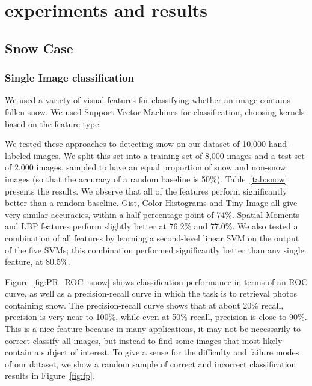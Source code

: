 \section{experiments and results}




\subsection{Snow Case}

\subsubsection{Single Image classification}

We used a variety of  visual features  for classifying
whether an image contains fallen snow. We used Support Vector
Machines for classification, choosing kernels based on the feature
type. 

We tested these approaches to detecting snow on our dataset of
10,000 hand-labeled images. We split this set into a training set of
8,000 images and a test set of 2,000 images, sampled to have an
 equal proportion of snow and non-snow images (so
that the accuracy of a random baseline is 50\%).
Table~\ref{tab:snow} presents the results. We observe that all of the
features perform significantly better than a random baseline. 
Gist, Color Histograms and Tiny Image all give very similar accuracies, within a half
percentage point of 74\%. Spatial Moments and
LBP  features perform
slightly better at 76.2\% and 77.0\%. We also tested a combination of all 
features by learning a second-level linear SVM on the output of the
five SVMs; this combination performed significantly better than any single feature,
at 80.5\%.


Figure~\ref{fig:PR_ROC_snow} shows classification performance in
terms of an ROC curve, as well as a
precision-recall curve in which the task is to retrieval photos
containing snow. The precision-recall curve shows that at about 20\%
recall, precision is very near to 100\%, while even at 50\% recall,
precision is close to 90\%.  This is a nice feature because in many
applications, it may not be necessarily to correct classify all
images, but instead to find some images that most likely contain a
subject of interest.
%
To give a sense for the difficulty and failure modes of our dataset,
we show a random sample of correct and incorrect classification results
in Figure~\ref{fig:fp}.

